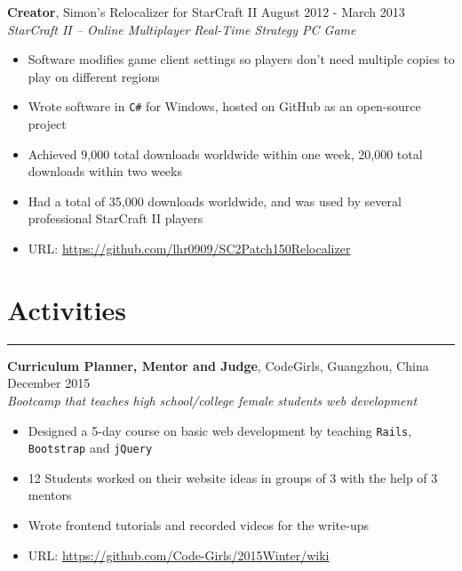 \documentclass[line]{res} %
\begin{document}
\begin{resume}
    \textbf{Creator}, Simon’s Relocalizer for StarCraft II
    \hfill August 2012 - March 2013 \\
    \textit{StarCraft II – Online Multiplayer Real-Time Strategy PC Game}
    \begin{itemize} \itemsep -2pt  %
      \item Software modifies game client settings so players don’t need multiple copies to play on different regions
      \item Wrote software in \texttt{C\#} for Windows, hosted on GitHub as an open-source project
      \item Achieved 9,000 total downloads worldwide within one week, 20,000 total downloads within two weeks
      \item Had a total of 35,000 downloads worldwide, and was used by several professional StarCraft II players
      \item URL: \underline{https://github.com/lhr0909/SC2Patch150Relocalizer}
    \end{itemize}

  \section{Activities}
  \rule{\textwidth}{1pt}
    \textbf{Curriculum Planner, Mentor and Judge}, CodeGirls, Guangzhou, China
    \hfill December 2015 \\
    \textit{Bootcamp that teaches high school/college female students web development}
    \begin{itemize} \itemsep -2pt  %
      \item Designed a 5-day course on basic web development by teaching \texttt{Rails},
      \texttt{Bootstrap} and \texttt{jQuery}
      \item 12 Students worked on their website ideas in groups of 3 with the help of 3 mentors
      \item Wrote frontend tutorials and recorded videos for the write-ups
      \item URL: \underline{https://github.com/Code-Girls/2015Winter/wiki}
    \end{itemize}


\end{resume}
\end{document}
